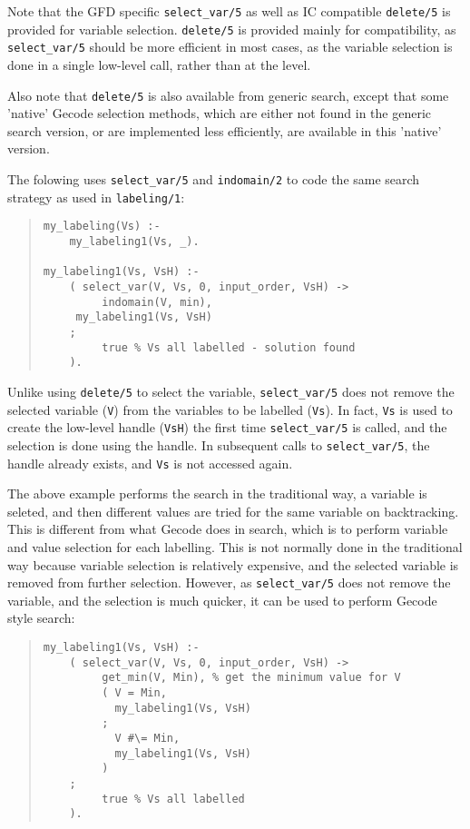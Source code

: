 Note that the GFD specific {\tt select_var/5} as well as IC compatible 
{\tt delete/5} is provided for variable selection. {\tt delete/5} is provided 
mainly for compatibility, as {\tt select_var/5} should be more efficient in
most cases, as the variable selection is done in a single low-level call,
rather than at the {\eclipse} level.

Also note that {\tt delete/5} 
is also available from generic search, except that
some 'native' Gecode selection methods, which are either not found in the 
generic search version,  or are implemented less efficiently, are available 
in this 'native' version. 

The folowing uses  \texttt{select_var/5} and \texttt{indomain/2} to code
the same search strategy as used in \texttt{labeling/1}:

\begin{quote}
\begin{verbatim}
my_labeling(Vs) :-
    my_labeling1(Vs, _).

my_labeling1(Vs, VsH) :-
    ( select_var(V, Vs, 0, input_order, VsH) ->
         indomain(V, min),
	 my_labeling1(Vs, VsH)
    ;
         true % Vs all labelled - solution found
    ).

\end{verbatim}
\end{quote}

Unlike using \texttt{delete/5} to select the variable, \texttt{select_var/5}
does not remove the selected variable (\texttt{V}) from the variables to be
labelled (\texttt{Vs}). In fact, \texttt{Vs} is used to create the low-level
handle (\texttt{VsH}) the first time \texttt{select_var/5} is called, and
the selection is done using the handle. In subsequent calls to
 \texttt{select_var/5}, the handle already exists, and \texttt{Vs} is not 
accessed again. 

The above example performs the search in the traditional way, a variable is
seleted, and then different values are tried for the same variable on 
backtracking. This is different from what Gecode does in search, which is to 
perform variable and value selection for each labelling. This is not normally
done in the traditional way because variable selection is relatively expensive,
and the selected variable is removed from further selection. However, as
\texttt{select_var/5} does not remove the variable, and the selection is
much quicker, it can be used to perform Gecode style search:

\begin{quote}
\begin{verbatim}
my_labeling1(Vs, VsH) :-
    ( select_var(V, Vs, 0, input_order, VsH) ->
         get_min(V, Min), % get the minimum value for V
         ( V = Min,
           my_labeling1(Vs, VsH)
         ;
           V #\= Min,
           my_labeling1(Vs, VsH)
         )
    ;
         true % Vs all labelled
    ).
\end{verbatim}
\end{quote}

